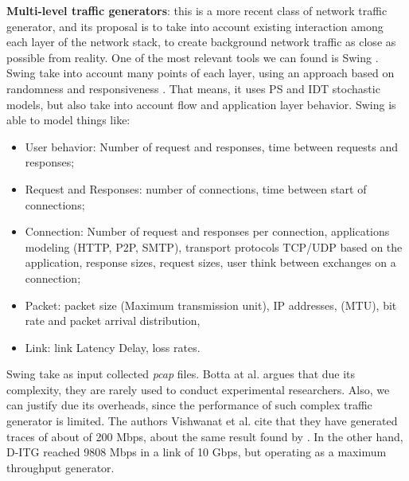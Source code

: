 \textbf{Multi-level traffic generators}: this is a more recent class of network traffic generator, and its proposal is to take into account existing interaction among each layer of the network stack, to create background network traffic as close as possible from reality. One of the most relevant tools we can found is Swing \cite{swing-paper}. Swing take into account many points of each layer, using an approach based on randomness and responsiveness \cite{swing-paper}. That means, it uses PS and IDT stochastic models, but also take into account flow and application layer behavior. Swing is able to model things like\cite{swing-paper}: 

\begin{itemize}

\item User behavior: Number of request and responses, time between requests and responses;

\item Request and Responses: number of connections, time between start of connections;

\item Connection: Number of request and responses per connection, applications modeling (HTTP, P2P, SMTP), transport protocols TCP/UDP based on the application, response sizes, request sizes, user think between exchanges on a connection;

\item Packet: packet size (Maximum transmission unit), IP addresses, (MTU), bit rate and packet arrival distribution, 

\item Link: link Latency Delay, loss rates.


\end{itemize}

Swing take as input collected \textit{pcap} files. Botta at al. \cite{do-you-trust} argues that due its complexity, they are rarely used to conduct experimental researchers. Also, we can  justify due its overheads, since the performance of such complex traffic generator is limited\cite{legotg-paper}. The authors Vishwanat et al. \cite{swing-paper} cite that they have generated traces of about of 200 Mbps, about the same result found by \cite{legotg-paper}. In the other hand, D-ITG reached 9808 Mbps\cite{comparative-trafficgen-tools} in a link of 10 Gbps, but operating as a maximum throughput generator.



